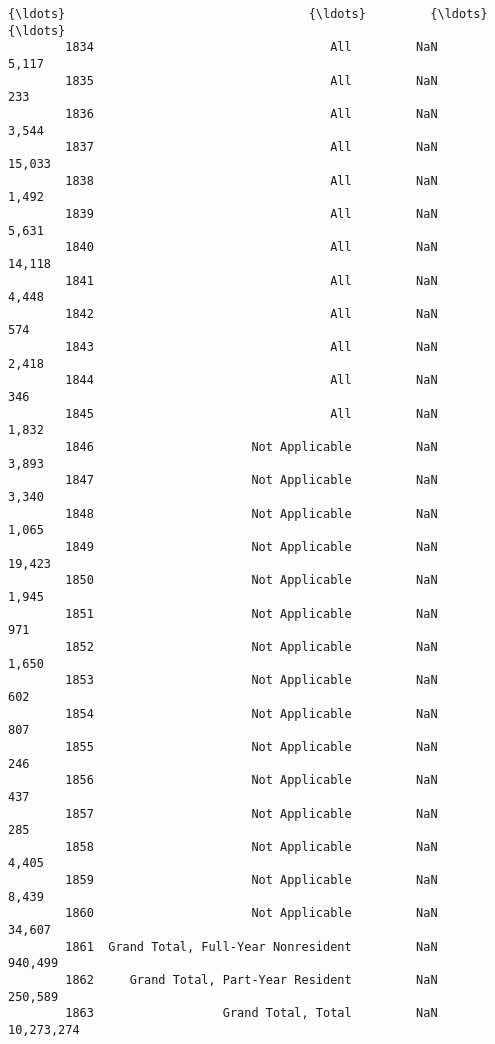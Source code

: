 \documentclass[11pt]{article}
\begin{document}
\begin{Verbatim}[commandchars=\\\{\}]
        {\ldots}                                  {\ldots}         {\ldots}                   {\ldots}   
        1834                                 All         NaN                 5,117   
        1835                                 All         NaN                   233   
        1836                                 All         NaN                 3,544   
        1837                                 All         NaN                15,033   
        1838                                 All         NaN                 1,492   
        1839                                 All         NaN                 5,631   
        1840                                 All         NaN                14,118   
        1841                                 All         NaN                 4,448   
        1842                                 All         NaN                   574   
        1843                                 All         NaN                 2,418   
        1844                                 All         NaN                   346   
        1845                                 All         NaN                 1,832   
        1846                      Not Applicable         NaN                 3,893   
        1847                      Not Applicable         NaN                 3,340   
        1848                      Not Applicable         NaN                 1,065   
        1849                      Not Applicable         NaN                19,423   
        1850                      Not Applicable         NaN                 1,945   
        1851                      Not Applicable         NaN                   971   
        1852                      Not Applicable         NaN                 1,650   
        1853                      Not Applicable         NaN                   602   
        1854                      Not Applicable         NaN                   807   
        1855                      Not Applicable         NaN                   246   
        1856                      Not Applicable         NaN                   437   
        1857                      Not Applicable         NaN                   285   
        1858                      Not Applicable         NaN                 4,405   
        1859                      Not Applicable         NaN                 8,439   
        1860                      Not Applicable         NaN                34,607   
        1861  Grand Total, Full-Year Nonresident         NaN               940,499   
        1862     Grand Total, Part-Year Resident         NaN               250,589   
        1863                  Grand Total, Total         NaN            10,273,274   
        

\end{Verbatim}
\end{document}
